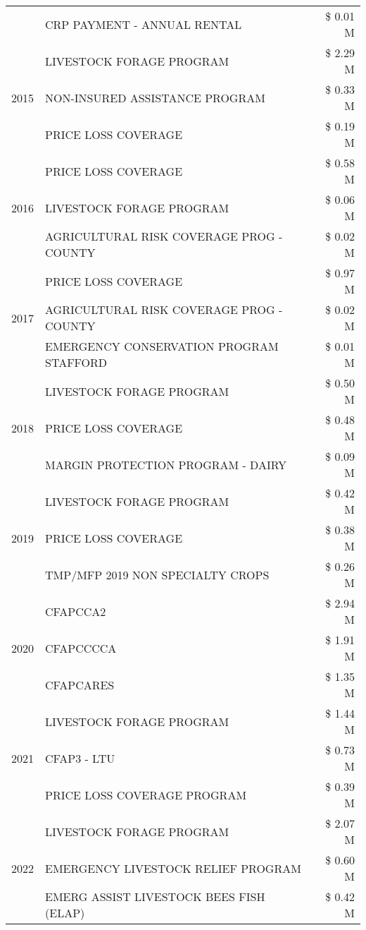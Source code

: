 \begin{tabular}{llr}
 & CRP PAYMENT - ANNUAL RENTAL & \$ 0.01 M \\
\cline{1-3}
\multirow[t]{3}{*}{2015} & LIVESTOCK FORAGE PROGRAM & \$ 2.29 M \\
 & NON-INSURED ASSISTANCE PROGRAM & \$ 0.33 M \\
 & PRICE LOSS COVERAGE & \$ 0.19 M \\
\cline{1-3}
\multirow[t]{3}{*}{2016} & PRICE LOSS COVERAGE & \$ 0.58 M \\
 & LIVESTOCK FORAGE PROGRAM & \$ 0.06 M \\
 & AGRICULTURAL RISK COVERAGE PROG - COUNTY & \$ 0.02 M \\
\cline{1-3}
\multirow[t]{3}{*}{2017} & PRICE LOSS COVERAGE & \$ 0.97 M \\
 & AGRICULTURAL RISK COVERAGE PROG - COUNTY & \$ 0.02 M \\
 & EMERGENCY CONSERVATION PROGRAM STAFFORD & \$ 0.01 M \\
\cline{1-3}
\multirow[t]{3}{*}{2018} & LIVESTOCK FORAGE PROGRAM & \$ 0.50 M \\
 & PRICE LOSS COVERAGE & \$ 0.48 M \\
 & MARGIN PROTECTION PROGRAM - DAIRY & \$ 0.09 M \\
\cline{1-3}
\multirow[t]{3}{*}{2019} & LIVESTOCK FORAGE PROGRAM & \$ 0.42 M \\
 & PRICE LOSS COVERAGE & \$ 0.38 M \\
 & TMP/MFP 2019 NON SPECIALTY CROPS & \$ 0.26 M \\
\cline{1-3}
\multirow[t]{3}{*}{2020} & CFAPCCA2 & \$ 2.94 M \\
 & CFAPCCCCA & \$ 1.91 M \\
 & CFAPCARES & \$ 1.35 M \\
\cline{1-3}
\multirow[t]{3}{*}{2021} & LIVESTOCK FORAGE PROGRAM & \$ 1.44 M \\
 & CFAP3 - LTU & \$ 0.73 M \\
 & PRICE LOSS COVERAGE PROGRAM & \$ 0.39 M \\
\cline{1-3}
\multirow[t]{3}{*}{2022} & LIVESTOCK FORAGE PROGRAM & \$ 2.07 M \\
 & EMERGENCY LIVESTOCK RELIEF PROGRAM & \$ 0.60 M \\
 & EMERG ASSIST LIVESTOCK BEES FISH (ELAP) & \$ 0.42 M \\
\cline{1-3}
\bottomrule
\end{tabular}
